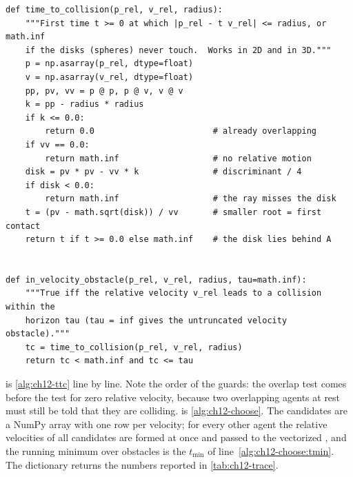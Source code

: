 \begin{lstlisting}[caption={Time to collision and membership in the truncated velocity obstacle (from \code{code/ch12\_velocity\_obstacles.py}); this is \cref{alg:ch12-ttc}.},label={lst:ch12-ttc}]
def time_to_collision(p_rel, v_rel, radius):
    """First time t >= 0 at which |p_rel - t v_rel| <= radius, or math.inf
    if the disks (spheres) never touch.  Works in 2D and in 3D."""
    p = np.asarray(p_rel, dtype=float)
    v = np.asarray(v_rel, dtype=float)
    pp, pv, vv = p @ p, p @ v, v @ v
    k = pp - radius * radius
    if k <= 0.0:
        return 0.0                        # already overlapping
    if vv == 0.0:
        return math.inf                   # no relative motion
    disk = pv * pv - vv * k               # discriminant / 4
    if disk < 0.0:
        return math.inf                   # the ray misses the disk
    t = (pv - math.sqrt(disk)) / vv       # smaller root = first contact
    return t if t >= 0.0 else math.inf    # the disk lies behind A


def in_velocity_obstacle(p_rel, v_rel, radius, tau=math.inf):
    """True iff the relative velocity v_rel leads to a collision within the
    horizon tau (tau = inf gives the untruncated velocity obstacle)."""
    tc = time_to_collision(p_rel, v_rel, radius)
    return tc < math.inf and tc <= tau
\end{lstlisting}

 is \cref{alg:ch12-ttc} line by line. Note the order of the
guards: the overlap test comes before the test for zero relative velocity,
because two overlapping agents at rest must still be told that they are
colliding.  is \cref{alg:ch12-choose}. The candidates
are a NumPy array with one row per velocity; for every other agent the
relative velocities of all candidates are formed at once and passed to the
vectorized , and the running minimum over obstacles is the
$t_{\min}$ of line~\ref{alg:ch12-choose:tmin}. The dictionary 
returns the numbers reported in \cref{tab:ch12-trace}.

